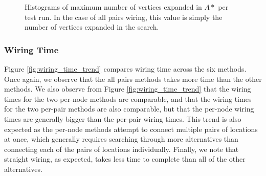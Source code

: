 \begin{figure}[H]
\begin{center}
\caption[Expanded vertices histograms]{Histograms of maximum number of vertices
expanded in $A*$ per test run.
In the case of all pairs wiring, this value is simply the number of vertices
expanded in the search.}
\label{fig:max_expanded}
\end{center}
\end{figure}

\subsubsection{Wiring Time}
Figure \ref{fig:wiring_time_trend} compares wiring time across
the six methods. Once again, we observe that the all pairs methods takes
more time than the other methods. We also observe from Figure
\ref{fig:wiring_time_trend} that the wiring times for the two per-node methods
are comparable, and that the wiring times for the two per-pair methods are also
comparable, but that the per-node wiring times are generally bigger than the
per-pair wiring times. This trend is also expected as the per-node methods
attempt to connect multiple pairs of locations at once, which generally requires
searching through more alternatives than
connecting each of the pairs of locations individually.
Finally, we note that straight wiring, as expected, takes less time to complete
than all of the other alternatives.

